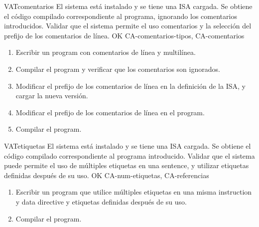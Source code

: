 \begin{testCase}{VAT}{comentarios}
    {El sistema está instalado y se tiene una \gls{ISA} cargada.} %
    {Se obtiene el código compilado correspondiente al programa, ignorando los
    comentarios introducidos.} %
    {Validar que el sistema permite el uso comentarios y la selección del
    prefijo de los comentarios de línea.} %
    {OK} %
    {CA-comentarios-tipos, CA-comentarios} %
    \begin{enumerate}[leftmargin=*, topsep=0pt, noitemsep] %
        \item Escribir un \gls{program} con comentarios de línea y multilínea.
        \item Compilar el \gls{program} y verificar que los comentarios son
        ignorados.
        \item Modificar el prefijo de los comentarios de línea en la definición
        de la \gls{ISA}, y cargar la nueva versión.
        \item Modificar el prefijo de los comentarios de línea en el
        \gls{program}.
        \item Compilar el \gls{program}.
    \end{enumerate}
\end{testCase}

\begin{testCase}{VAT}{etiquetas}
    {El sistema está instalado y se tiene una \gls{ISA} cargada.} %
    {Se obtiene el código compilado correspondiente al programa introducido.} %
    {Validar que el sistema puede permite el uso de múltiples etiquetas en una
    \gls{sentence}, y utilizar etiquetas definidas después de su uso.} %
    {OK} %
    {CA-num-etiquetas, CA-referencias} %
    \begin{enumerate}[leftmargin=*, topsep=0pt, noitemsep] %
        \item Escribir un \gls{program} que utilice múltiples etiquetas en una
        misma \gls{instruction} y \gls{data directive} y etiquetas definidas
        después de su uso.
        \item Compilar el \gls{program}.
    \end{enumerate}
\end{testCase}


